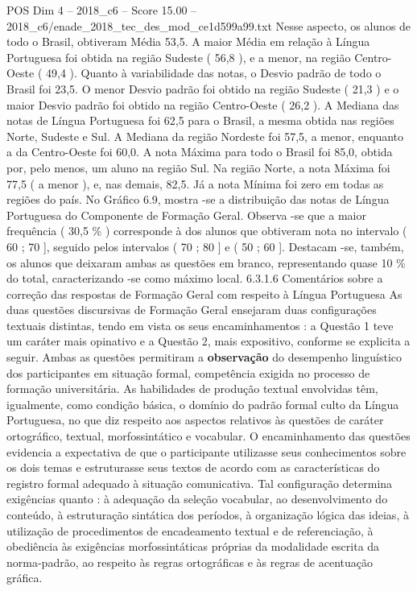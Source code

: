 \begin{textsample}{POS Dim 4 – 2018\_c6 – Score 15.00 – 2018\_c6/enade\_2018\_tec\_des\_mod\_ce1d599a99.txt}
Nesse aspecto, os alunos de todo o Brasil, obtiveram Média 53,5.
A maior Média em relação à Língua Portuguesa foi obtida na região Sudeste ( 56,8 ), e a menor, na região Centro-Oeste ( 49,4 ).
Quanto à variabilidade das notas, o Desvio padrão de todo o Brasil foi 23,5.
O menor Desvio padrão foi obtido na região Sudeste ( 21,3 ) e o maior Desvio padrão foi obtido na região Centro-Oeste ( 26,2 ).
A Mediana das notas de Língua Portuguesa foi 62,5 para o Brasil, a mesma obtida nas regiões Norte, Sudeste e Sul.
A Mediana da região Nordeste foi 57,5, a menor, enquanto a da Centro-Oeste foi 60,0.
A nota Máxima para todo o Brasil foi 85,0, obtida por, pelo menos, um aluno na região Sul.
Na região Norte, a nota Máxima foi 77,5 ( a menor ), e, nas demais, 82,5.
Já a nota Mínima foi zero em todas as regiões do país.
No Gráfico 6.9, mostra -se a distribuição das notas de Língua Portuguesa do Componente de Formação Geral.
Observa -se que a maior frequência ( 30,5 \% ) corresponde à dos alunos que obtiveram nota no intervalo ( 60 ; 70 ], seguido pelos intervalos ( 70 ; 80 ] e ( 50 ; 60 ].
Destacam -se, também, os alunos que deixaram ambas as questões em branco, representando quase 10 \% do total, caracterizando -se como máximo local. 6.3.1.6 Comentários sobre a correção das respostas de Formação Geral com respeito à Língua Portuguesa As duas questões discursivas de Formação Geral ensejaram duas configurações textuais distintas, tendo em vista os seus encaminhamentos : a Questão 1 teve um caráter mais opinativo e a Questão 2, mais expositivo, conforme se explicita a seguir.
Ambas as questões permitiram a \textbf{observação} do desempenho linguístico dos participantes em situação formal, competência exigida no processo de formação universitária.
As habilidades de produção textual envolvidas têm, igualmente, como condição básica, o domínio do padrão formal culto da Língua Portuguesa, no que diz respeito aos aspectos relativos às questões de caráter ortográfico, textual, morfossintático e vocabular.
O encaminhamento das questões evidencia a expectativa de que o participante utilizasse seus conhecimentos sobre os dois temas e estruturasse seus textos de acordo com as características do registro formal adequado à situação comunicativa.
Tal configuração determina exigências quanto : à adequação da seleção vocabular, ao desenvolvimento do conteúdo, à estruturação sintática dos períodos, à organização lógica das ideias, à utilização de procedimentos de encadeamento textual e de referenciação, à obediência às exigências morfossintáticas próprias da modalidade escrita da norma-padrão, ao respeito às regras ortográficas e às regras de acentuação gráfica.

\end{textsample}
